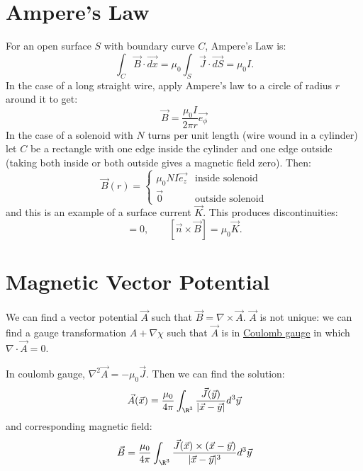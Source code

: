 \documentclass[../Main.tex]{subfiles}
\begin{document}
\section{Ampere's Law}
For an open surface $S$ with boundary curve $C$, Ampere's Law is:
\begin{equation*}
    \int_C \vec{B} \cdot \vec{dx} = \mu_0 \int_S \vec{J} \cdot \vec{dS} = \mu_0 I.
\end{equation*}
In the case of a long straight wire, apply Ampere's law to a circle of radius $r$ around it to get:
\begin{equation*}
    \vec{B} = \frac{\mu_0 I}{2\pi r}\vec{e_\phi}
\end{equation*}
In the case of a solenoid with $N$ turns per unit length (wire wound in a cylinder) let $C$ be a rectangle with one edge inside the cylinder and one edge outside (taking both inside or both outside gives a magnetic field zero). Then:
\begin{equation*}
    \vec{B}(r) =
    \begin{cases}
        \mu_0 N I \vec{e_z} & \text{inside solenoid} \\
        \vec0 & \text{outside solenoid}
    \end{cases}
\end{equation*}
and this is an example of a surface current $\vec{K}$. This produces discontinuities:
\begin{equation*}
    [\vec{n} \cdot \vec{B}] = 0, \qquad [\vec{n} \times \vec{B}] = \mu_0 \vec{K}.
\end{equation*}
\section{Magnetic Vector Potential}
We can find a vector potential $\vec{A}$ such that $\vec{B} = \nabla \times \vec{A}$. $\vec{A}$ is not unique: we can find a gauge transformation $A + \nabla \chi$ such that $\vec{A}$ is in \underline{Coulomb gauge} in which $\nabla \cdot \vec{A} = 0$.

In coulomb gauge, $\nabla^2 \vec{A} = -\mu_0 \vec{J}$. Then we can find the solution:
\begin{equation*}
    \vec{A}(\vec{x}) = \frac{\mu_0}{4\pi} \int_{\R^3} \frac{\vec{J}(\vec{y})}{|\vec{x} - \vec{y}|}d^3\vec{y}
\end{equation*}
and corresponding magnetic field:
\begin{equation*}
    \vec{B} = \frac{\mu_0}{4\pi} \int_{\R^3} \frac{\vec{J}(\vec{x}) \times (\vec{x} - \vec{y})}{|\vec{x} - \vec{y}|^3} d^3\vec{y}
\end{equation*}
\end{document}
